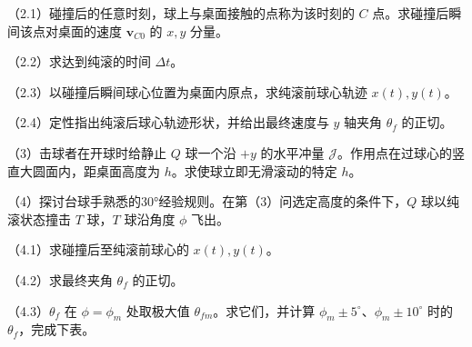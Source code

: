 \documentclass[12pt,a4paper,fontset=fandol]{ctexart}
\begin{document}
（2.1）碰撞后的任意时刻，球上与桌面接触的点称为该时刻的 \(C\)
点。求碰撞后瞬间该点对桌面的速度 \(\boldsymbol v_{C0}\) 的 \(x,y\)
分量。

（2.2）求达到纯滚的时间 \(\Delta t\)。

（2.3）以碰撞后瞬间球心位置为桌面内原点，求纯滚前球心轨迹
\(x(t),y(t)\)。

（2.4）定性指出纯滚后球心轨迹形状，并给出最终速度与 \(y\) 轴夹角
\(\theta_f\) 的正切。

（3）击球者在开球时给静止 \(Q\) 球一个沿 \(+y\) 的水平冲量
\(\mathcal J\)。作用点在过球心的竖直大圆面内，距桌面高度为
\(h\)。求使球立即无滑滚动的特定 \(h\)。

\begin{center}
\begin{minipage}{\linewidth}
\centering\begingroup
{}
\ifdim\wd\diagrambox>.88\linewidth
\sbox{\diagrambox}{\resizebox{.88\linewidth}{!}{\usebox{\diagrambox}}}
\fi
\ifdim\ht\diagrambox>.40\textheight
\resizebox{!}{.40\textheight}{\usebox{\diagrambox}}
\else\usebox{\diagrambox}\fi
\par{}
\endgroup\end{minipage}
\end{center}

（4）探讨台球手熟悉的30°经验规则。在第（3）问选定高度的条件下，\(Q\)
球以纯滚状态撞击 \(T\) 球，\(T\) 球沿角度 \(\phi\) 飞出。

（4.1）求碰撞后至纯滚前球心的 \(x(t),y(t)\)。

（4.2）求最终夹角 \(\theta_f\) 的正切。

（4.3）\(\theta_f\) 在 \(\phi=\phi_m\) 处取极大值
\(\theta_{fm}\)。求它们，并计算
\(\phi_m\pm5^\circ\)、\(\phi_m\pm10^\circ\) 时的
\(\theta_f\)，完成下表。
\end{document}
